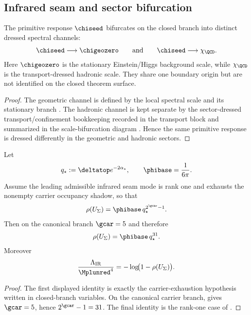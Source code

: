 \subsection{Infrared seam and sector bifurcation}

\begin{theorem}
\label{thm:sector-dressed-spectral-scale-bifurcation}
The primitive response $\chiseed$ bifurcates on the closed branch into distinct dressed spectral
channels:
\[
\chiseed\longrightarrow \chigeozero
\qquad\text{and}\qquad
\chiseed\longrightarrow \chi_{\QCD}.
\]
Here $\chigeozero$ is the stationary Einstein/Higgs background scale, while $\chi_{\QCD}$ is the
transport-dressed hadronic scale. They share one boundary origin but are not identified on the
closed theorem surface.
\end{theorem}

\begin{proof}
The geometric channel is defined by the local spectral scale and its stationary branch
. The hadronic channel is
kept separate by the sector-dressed transport/confinement bookkeeping recorded in the transport
block and summarized in the scale-bifurcation diagram . Hence the
same primitive response is dressed differently in the geometric and hadronic sectors.
\end{proof}

\begin{theorem}
\label{thm:carrier-exhausted-ir-seam-eigenvalue}
Let
\[
q_\star:=\deltatop e^{-2\alpha_\star},
\qquad
\phibase=\frac{1}{6\pi}.
\]
Assume the leading admissible infrared seam mode is rank one and exhausts the nonempty carrier
occupancy shadow, so that
\[
\rho(U_\Sigma)=\phibase\,q_\star^{2^{\gcar}-1}.
\]
Then on the canonical branch $\gcar=5$ and therefore
\[
\rho(U_\Sigma)=\phibase\,q_\star^{31}.
\]
Moreover
\[
\frac{\Lambda_{\mathrm{IR}}}{\Mplunred^4}
=
-\log\!\bigl(1-\rho(U_\Sigma)\bigr).
\]
\end{theorem}

\begin{proof}
The first displayed identity is exactly the carrier-exhaustion hypothesis written in closed-branch
variables. On the canonical carrier branch,  gives
$\gcar=5$, hence $2^{\gcar}-1=31$. The final identity is the rank-one case of
.
\end{proof}

